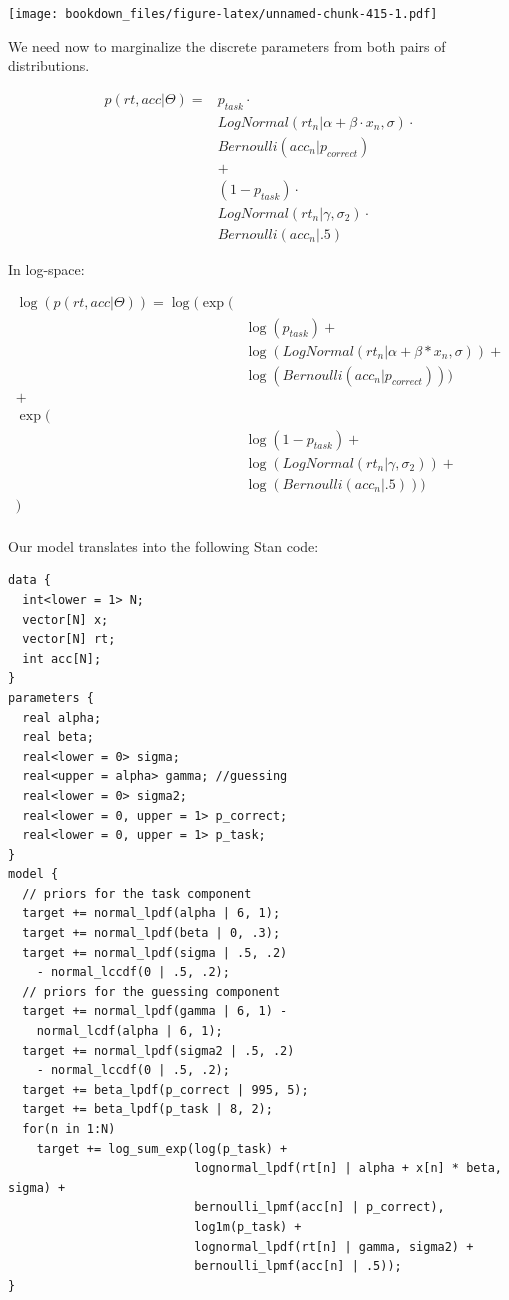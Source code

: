 \documentclass[12pt,]{krantz}
\theoremstyle{definition}
\theoremstyle{definition}
\theoremstyle{definition}
\theoremstyle{remark}
\begin{document}
\texttt{[image: bookdown\_files/figure-latex/unnamed-chunk-415-1.pdf]}

We need now to marginalize the discrete parameters from both pairs of distributions.

\begin{equation}
\begin{aligned}
p(rt, acc | \Theta) = & p_{task} \cdot \\
& LogNormal(rt_n | \alpha + \beta \cdot x_n, \sigma) \cdot \\
& Bernoulli(acc_n | p_{correct}) \\
& +\\ 
& (1 - p_{task}) \cdot \\
& LogNormal(rt_n | \gamma, \sigma_2) \cdot\\
& Bernoulli(acc_n | .5)
\end{aligned}
\end{equation}

In log-space:

\begin{equation}
\begin{aligned}
\log(p(rt, acc | \Theta)) =  \log(\exp(&\\
& \log(p_{task}) +\\
  &\log(LogNormal(rt_n | \alpha + \beta * x_n, \sigma)) + \\
  &\log(Bernoulli(acc_n | p_{correct})))\\
  +&\\ 
 \exp(&\\
 & \log(1 - p_{task}) + \\
 & \log(LogNormal(rt_n |\gamma, \sigma_2)) + \\
 & \log(Bernoulli(acc_n | .5)))\\
    )& \\
\end{aligned}
\end{equation}

Our model translates into the following Stan code:

\begin{verbatim}
data {
  int<lower = 1> N;
  vector[N] x;
  vector[N] rt;
  int acc[N];
}
parameters {
  real alpha;
  real beta;
  real<lower = 0> sigma;
  real<upper = alpha> gamma; //guessing
  real<lower = 0> sigma2;
  real<lower = 0, upper = 1> p_correct;
  real<lower = 0, upper = 1> p_task;
}
model {
  // priors for the task component
  target += normal_lpdf(alpha | 6, 1);
  target += normal_lpdf(beta | 0, .3);
  target += normal_lpdf(sigma | .5, .2)
    - normal_lccdf(0 | .5, .2);
  // priors for the guessing component
  target += normal_lpdf(gamma | 6, 1) -
    normal_lcdf(alpha | 6, 1);
  target += normal_lpdf(sigma2 | .5, .2)
    - normal_lccdf(0 | .5, .2);
  target += beta_lpdf(p_correct | 995, 5);
  target += beta_lpdf(p_task | 8, 2);
  for(n in 1:N)
    target += log_sum_exp(log(p_task) +
                          lognormal_lpdf(rt[n] | alpha + x[n] * beta, sigma) +
                          bernoulli_lpmf(acc[n] | p_correct),
                          log1m(p_task) +
                          lognormal_lpdf(rt[n] | gamma, sigma2) +
                          bernoulli_lpmf(acc[n] | .5));
}
\end{verbatim}
\end{document}
